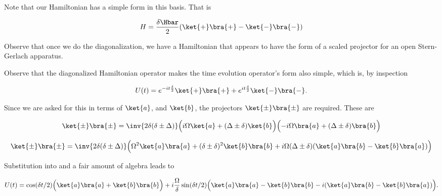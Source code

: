 {Note that our Hamiltonian has a simple form in this basis.  That is

\begin{equation}\label{eqn:qmIexamPractice2008Dec:2:70}
H = \frac{\delta \Hbar}{2} (\ket{+}\bra{+} - \ket{-}\bra{-} )
\end{equation}

Observe that once we do the diagonalization, we have a Hamiltonian that appears to have the form of a scaled projector for an open Stern-Gerlach apparatus.

Observe that the diagonalized Hamiltonian operator makes the time evolution operator's form also simple, which is, by inspection

\begin{equation}\label{eqn:qmIexamPractice2008Dec:2:80}
U(t) = 
e^{-i t \frac{\delta}{2}} \ket{+}\bra{+} 
+ e^{i t \frac{\delta}{2}} \ket{-}\bra{-}.
\end{equation}

Since we are asked for this in terms of \(\ket{a}\), and \(\ket{b}\), the projectors \(\ket{\pm}\bra{\pm}\) are required.  These are

\begin{equation}\label{eqn:qmIexamPractice:690}
\begin{aligned}
\ket{\pm}\bra{\pm} 
&= \inv{2 \delta (\delta \pm \Delta)}
\Bigl( i \Omega \ket{a} + (\Delta \pm \delta) \ket{b} \Bigr)
\Bigl( -i \Omega \bra{a} + (\Delta \pm \delta) \bra{b} \Bigr) \\
\end{aligned}
\end{equation}

\begin{equation}\label{eqn:qmIexamPractice2008Dec:2:90}
\ket{\pm}\bra{\pm} 
= \inv{2 \delta (\delta \pm \Delta)}
\Bigl(
\Omega^2 \ket{a}\bra{a}
+(\delta \pm \delta)^2 \ket{b}\bra{b}
+i \Omega (\Delta \pm \delta) (
\ket{a}\bra{b}
-\ket{b}\bra{a}
)
\Bigr)
\end{equation}

Substitution into  and a fair amount of algebra leads to

\begin{equation}\label{eqn:qmIexamPractice2008Dec:2:100}
U(t) = 
\cos(\delta t/2) \Bigl( \ket{a}\bra{a} + \ket{b}\bra{b} \Bigr)
+ i \frac{\Omega}{\delta} \sin(\delta t/2) \Bigl( 
\ket{a}\bra{a} - \ket{b}\bra{b} 
-i (\ket{a}\bra{b} - \ket{b}\bra{a} )
\Bigr).
\end{equation}

}
